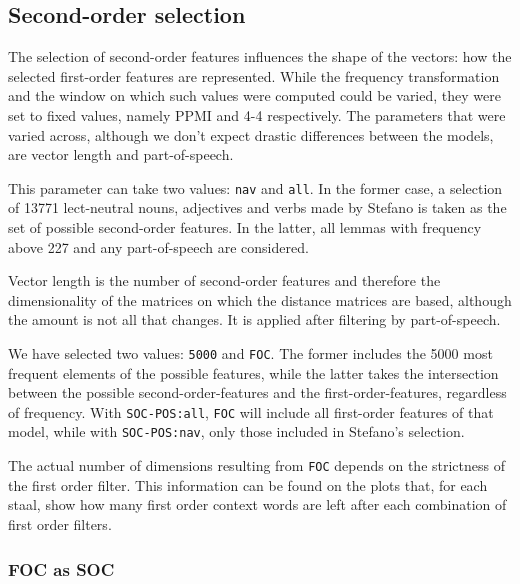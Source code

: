 \documentclass[
]{book}
\providecommand{\tightlist}{%
  \setlength{\itemsep}{0pt}\setlength{\parskip}{0pt}}
\begin{document}
\hypertarget{second-order-selection}{%
\subsection{Second-order selection}\label{second-order-selection}}

The selection of second-order features influences the shape of the vectors: how the selected first-order features are represented. While the frequency transformation and the window on which such values were computed could be varied, they were set to fixed values, namely PPMI and 4-4 respectively. The parameters that were varied across, although we don't expect drastic differences between the models, are vector length and part-of-speech.

\begin{description}
\tightlist
\item[\texttt{SOC-POS} (second order part-of-speech)]
This parameter can take two values: \texttt{nav} and \texttt{all}. In the former case, a selection of 13771 lect-neutral nouns, adjectives and verbs made by Stefano is taken as the set of possible second-order features. In the latter, all lemmas with frequency above 227 and any part-of-speech are considered.
\item[\texttt{LENGTH}]
Vector length is the number of second-order features and therefore the dimensionality of the matrices on which the distance matrices are based, although the amount is not all that changes. It is applied after filtering by part-of-speech.

We have selected two values: \texttt{5000} and \texttt{FOC}. The former includes the 5000 most frequent elements of the possible features, while the latter takes the intersection between the possible second-order-features and the first-order-features, regardless of frequency. With \texttt{SOC-POS:all}, \texttt{FOC} will include all first-order features of that model, while with \texttt{SOC-POS:nav}, only those included in Stefano's selection.

The actual number of dimensions resulting from \texttt{FOC} depends on the strictness of the first order filter. This information can be found on the plots that, for each staal, show how many first order context words are left after each combination of first order filters.
\end{description}

\hypertarget{foc-as-soc}{%
\subsubsection{FOC as SOC}\label{foc-as-soc}}
\end{document}
